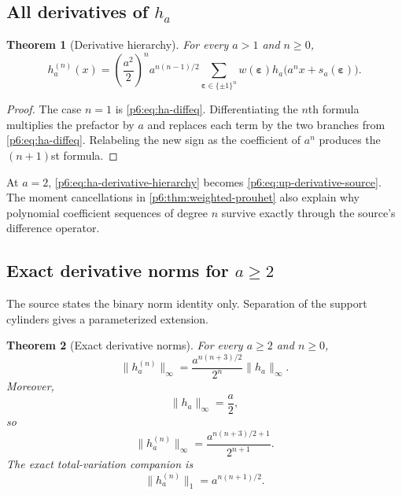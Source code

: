 \documentclass[11pt,oneside]{article}
\numberwithin{equation}{section}
\newtheorem{theorem}{Theorem}[section]
\theoremstyle{definition}
\theoremstyle{remark}
\begin{document}
\subsection{All derivatives of \texorpdfstring{$h_a$}{h-a}}

\begin{theorem}[Derivative hierarchy]\label{p6:thm:ha-derivatives}
For every $a>1$ and $n\ge0$,
\begin{equation}\label{p6:eq:ha-derivative-hierarchy}
 h_a^{(n)}(x)=
 \left(\frac{a^2}{2}\right)^n
 a^{n(n-1)/2}
 \sum_{\boldsymbol\varepsilon\in\{\pm1\}^n}
 w(\boldsymbol\varepsilon)
 h_a\bigl(a^nx+s_a(\boldsymbol\varepsilon)\bigr).
\end{equation}
\end{theorem}

\begin{proof}
The case $n=1$ is \eqref{p6:eq:ha-diffeq}.  Differentiating the $n$th formula
multiplies the prefactor by $a$ and replaces each term by the two branches from
\eqref{p6:eq:ha-diffeq}.  Relabeling the new sign as the coefficient of $a^n$
produces the $(n+1)$st formula.
\end{proof}

At $a=2$, \eqref{p6:eq:ha-derivative-hierarchy} becomes
\eqref{p6:eq:up-derivative-source}.  The moment cancellations in
\cref{p6:thm:weighted-prouhet} also explain why polynomial coefficient sequences
of degree $n$ survive exactly through the source's difference operator.

\subsection{Exact derivative norms for \texorpdfstring{$a\ge2$}{a greater than or equal to 2}}

The source states the binary norm identity only.  Separation of the support
cylinders gives a parameterized extension.

\begin{theorem}[Exact derivative norms]\label{p6:thm:exact-derivative-norm}
For every $a\ge2$ and $n\ge0$,
\begin{equation}\label{p6:eq:exact-derivative-norm}
 \|h_a^{(n)}\|_\infty
 =\frac{a^{n(n+3)/2}}{2^n}\|h_a\|_\infty.
\end{equation}
Moreover,
\begin{equation}\label{p6:eq:ha-max}
 \|h_a\|_\infty=\frac a2,
\end{equation}
so
\begin{equation}\label{p6:eq:exact-derivative-norm-closed}
 \boxed{
 \|h_a^{(n)}\|_\infty
 =\frac{a^{n(n+3)/2+1}}{2^{n+1}}.}
\end{equation}
The exact total-variation companion is
\begin{equation}\label{p6:eq:exact-derivative-L1}
 \boxed{\|h_a^{(n)}\|_1=a^{n(n+1)/2}.}
\end{equation}
\end{theorem}
\end{document}
